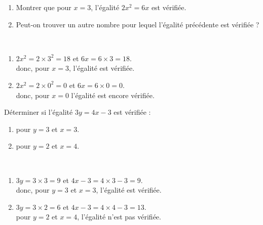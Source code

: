 \begin{colonne*exercice}
\bigskip


\begin{exercice} %
   \begin{enumerate}
      \item Montrer que pour $x =3$, l'égalité $2x^2 =6x$ est vérifiée.
      \item Peut-on trouver un autre nombre pour lequel l'égalité précédente est vérifiée ?
   \end{enumerate}
\end{exercice}

\begin{corrige}
   \ \\ [-5mm]
   \begin{enumerate}
      \item $2x^2 =2\times3^2 =18$ et $6x =6\times3 =18$. \\
      donc, pour $x =3$, {\blue l'égalité est vérifiée}.
      \item $2x^2 =2\times0^2 =0$ et $6x =6\times0 =0$. \\
      donc, {\blue pour $x =0$} l'égalité est encore vérifiée.
   \end{enumerate}
\end{corrige}

\bigskip


\begin{exercice} %
   Déterminer si l'égalité $3y =4x-3$ est vérifiée :
   \begin{enumerate}
      \item pour $y =3$ et $x =3$.
      \item pour $y =2$ et $x =4$.
   \end{enumerate}
\end{exercice}

\begin{corrige}
   \ \\ [-5mm]
   \begin{enumerate}
      \item $3y =3\times3 =9$ et $4x-3 =4\times3-3 =9$. \\
      donc, pour $y =3$ et $x =3$, {\blue l'égalité est vérifiée}.
      \item $3y =3\times2 =6$ et $4x-3 =4\times4-3 =13$. \\
      pour $y =2$ et $x =4$, {\blue l'égalité n'est pas vérifiée}.
   \end{enumerate}
\end{corrige}

\bigskip



\end{colonne*exercice}
